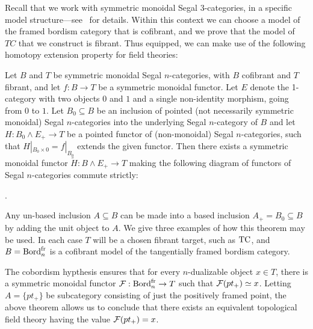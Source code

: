 \documentclass{amsart}
\begin{document}
Recall that we work with symmetric monoidal Segal $3$-categories, in a specific model structure---see~\cite{TC} for details.  Within this context we can choose a model of the framed bordism category that is cofibrant, and we prove that the model of $TC$ that we construct is fibrant.  Thus equipped, we can make use of the following homotopy extension property for field theories:
\begin{theorem}[ \cite{3TC} ] \label{thm:HEP}
	Let $B$ and $T$ be symmetric monoidal Segal $n$-categories, with $B$ cofibrant and $T$ fibrant, and let $f: B  \to T$ be a symmetric monoidal functor. Let $E$ denote the 1-category with two objects $0$ and $1$ and a single non-identity morphism, going from $0$ to $1$.  Let  $B_0 \subseteq B$ be an inclusion of pointed (not necessarily symmetric monoidal) Segal $n$-categories into the underlying Segal $n$-category of $B$ and let $H: B_0 \wedge E_+ \to T$ be a pointed functor of (non-monoidal) Segal $n$-categories, such that $H |_{B_0 \times 0} = f|_{B_0}$ extends the given functor.
Then there exists a symmetric monoidal functor $\tilde{H}: B \wedge E_+ \to T$ making the following diagram of functors of Segal $n$-categories commute strictly:
	\begin{center}
	.
	\end{center}
\end{theorem}
Any un-based inclusion $A \subseteq B$ can be made into a based inclusion $A_+ = B_0 \subseteq B$ by adding the unit object to $A$. 
We give three examples of how this theorem may be used. In each case $T$ will be a chosen fibrant target, such as $\mathrm{TC}$, and $B = \mathrm{Bord}^\mathrm{fr}_n$ is a cofibrant model of the tangentially framed bordism category.

\begin{example}
	The cobordism hypthesis ensures that for every $n$-dualizable object $x \in T$, there is a symmetric monoidal functor $\mathcal F: \mathrm{Bord}^\mathrm{fr}_n \to T$ such that $\mathcal F(pt_+) \simeq x$. Letting $A = \{ pt_+ \}$ be subcategory consisting of just the positively framed point, the above theorem allows us to conclude that there exists an equivalent topological field theory having the value $\mathcal F(pt_+) = x$. 	
\end{example}
\end{document}
